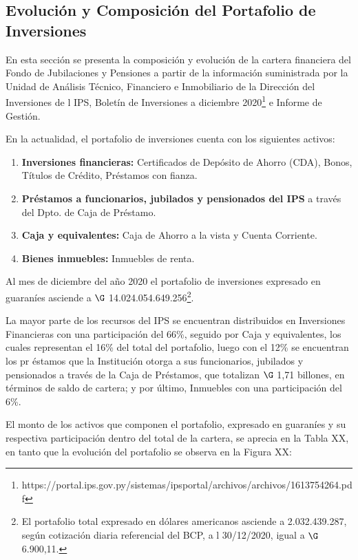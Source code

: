 \subsection{Evolución y Composición del Portafolio de Inversiones}

En esta sección se presenta la composición y evolución de la cartera
financiera del Fondo de Jubilaciones y Pensiones a partir de la
información suministrada por la Unidad de Análisis Técnico, Financiero e
Inmobiliario de la Dirección del Inversiones de l IPS, Boletín de
Inversiones a diciembre
2020\footnote{https://portal.ips.gov.py/sistemas/ipsportal/archivos/archivos/1613754264.pdf}
e Informe de Gestión.

En la actualidad, el portafolio de inversiones cuenta con los siguientes
activos:

\begin{enumerate}
\item \textbf{Inversiones financieras:} Certificados de Depósito de Ahorro (CDA), Bonos, Títulos de Crédito, Préstamos con fianza.
\item \textbf{Préstamos a funcionarios, jubilados y pensionados del IPS} a través del Dpto. de Caja de Préstamo.
\item \textbf{Caja y equivalentes:} Caja de Ahorro a la vista y Cuenta Corriente.  
\item \textbf{Bienes inmuebles:} Inmuebles de renta.
\end{enumerate}

Al mes de diciembre del año 2020 el portafolio de inversiones expresado
en guaraníes asciende a \(\G\)
14.024.054.649.256\footnote{El portafolio total expresado en dólares americanos asciende a 2.032.439.287, según cotización diaria referencial del BCP, a
l 30/12/2020, igual a $\G$ 6.900,11.}.

La mayor parte de los recursos del IPS se encuentran distribuidos en
Inversiones Financieras con una participación del 66\%, seguido por Caja
y equivalentes, los cuales representan el 16\% del total del portafolio,
luego con el 12\% se encuentran los pr éstamos que la Institución otorga
a sus funcionarios, jubilados y pensionados a través de la Caja de
Préstamos, que totalizan \(\G\) 1,71 billones, en términos de saldo de
cartera; y por último, Inmuebles con una participación del 6\%.

El monto de los activos que componen el portafolio, expresado en
guaraníes y su respectiva participación dentro del total de la cartera,
se aprecia en la Tabla XX, en tanto que la evolución del portafolio se
observa en la Figura XX:


